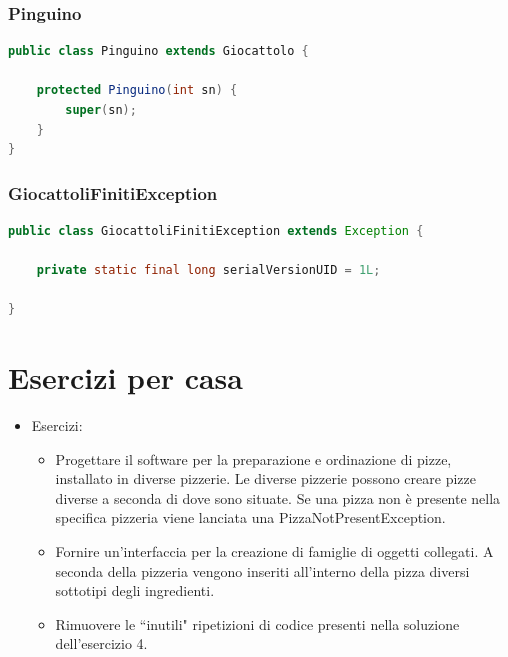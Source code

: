 \documentclass{article}
\begin{document}
\subsubsection{Pinguino}
\begin{lstlisting}[language=Java]
public class Pinguino extends Giocattolo {

	protected Pinguino(int sn) {
		super(sn);
	}
}
\end{lstlisting}

\subsubsection{GiocattoliFinitiException}
\begin{lstlisting}[language=Java]
public class GiocattoliFinitiException extends Exception {

	private static final long serialVersionUID = 1L;

}
\end{lstlisting}

\section{Esercizi per casa}
\begin{itemize}
\item Esercizi:
\begin{itemize}
\item Progettare il software per la preparazione e ordinazione di pizze, installato in diverse pizzerie. Le diverse pizzerie possono creare pizze diverse a seconda di dove sono situate. Se una pizza non \`e presente nella specifica pizzeria viene lanciata una PizzaNotPresentException.
\item Fornire un’interfaccia per la creazione di famiglie di oggetti collegati. A seconda della pizzeria vengono inseriti all'interno della pizza diversi sottotipi degli ingredienti.
\item Rimuovere le  ``inutili" ripetizioni di codice presenti nella soluzione dell'esercizio 4.
\end{itemize} 
\end{itemize}

\clearpage







\nocite{*}
\end{document}
